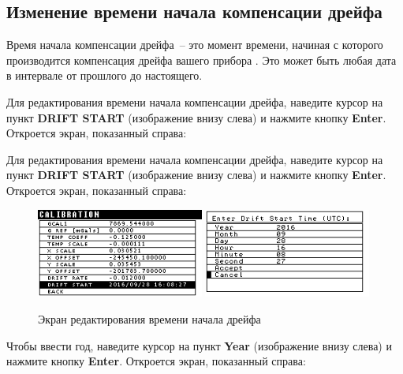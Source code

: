 \subsection{Изменение времени начала компенсации дрейфа}

Время начала компенсации дрейфа~-- это момент времени, начиная с которого
производится компенсация дрейфа вашего прибора \cg{}. Это может быть любая дата в
интервале от прошлого до настоящего.

Для редактирования времени начала компенсации дрейфа, наведите курсор на пункт
\textbf{DRIFT START} (изображение внизу слева) и нажмите кнопку \textbf{Enter}.
Откроется экран, показанный справа:


Для редактирования времени начала компенсации дрейфа, наведите курсор на пункт
\textbf{DRIFT START} (изображение внизу слева) и нажмите кнопку \textbf{Enter}.
Откроется экран, показанный справа:

\begin{figure}[H]
  \centering
  \includegraphics[width=0.49\textwidth]{figures/the_drift_start_time_editing_screen_1}
  \includegraphics[width=0.49\textwidth]{figures/the_drift_start_time_editing_screen_2}
  \caption{Экран редактирования времени начала дрейфа}
  \label{fig:the_drift_start_time_editing_screen}
\end{figure}

Чтобы ввести год, наведите курсор на пункт \textbf{Year} (изображение внизу слева) и
нажмите кнопку \textbf{Enter}. Откроется экран, показанный справа:

